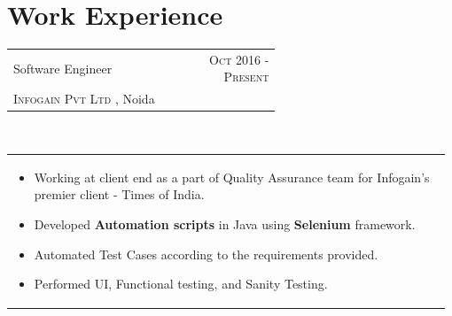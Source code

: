 \documentclass[a4paper]{article} %
\newcommand{\verticalspacing}{-0.25cm}
\newcommand{\bulletspace}{0.7cm}
\newcommand{\projectheadspacing}{6.9cm}
\newcommand{\highlight}[2]{%
    \begin{tabular}{p{2.4cm}|l}
        \textsc {\large #1} & #2
    \end{tabular}
}
\newcommand{\cproject}[5]{%
    \begin{tabular}{p{0.60\linewidth}r}
        \textcolor{NavyBlue}{\small #2} & \multicolumn{1}{m{ \projectheadspacing{} }}{\raggedleft \small {\textsc{#1}}}\\
        \small {#3} & \small {#4}
    \end{tabular}\\
    \begin{tabular}{p{0.98\linewidth}}
    \vspace{-0.3cm}
        \small{#5}
    \end{tabular}
    \vspace{\verticalspacing{}}
}
\begin{document}
%
%





%
\section{Work Experience}

\cproject
      {Oct 2016 - Present}
      {Software Engineer}
      {\textsc{Infogain Pvt Ltd }, Noida}
      {}
      {%
        \begin{itemize}[leftmargin=\bulletspace{}]
          \item Working at client end as a part of Quality Assurance team for Infogain’s premier client - Times of India.
          \item Developed \textbf{Automation scripts} in Java using \textbf{Selenium} framework.
          \item Automated Test Cases according to the requirements provided.
          \item Performed UI, Functional testing, and Sanity Testing.
        \end{itemize}
      }
\end{document}
